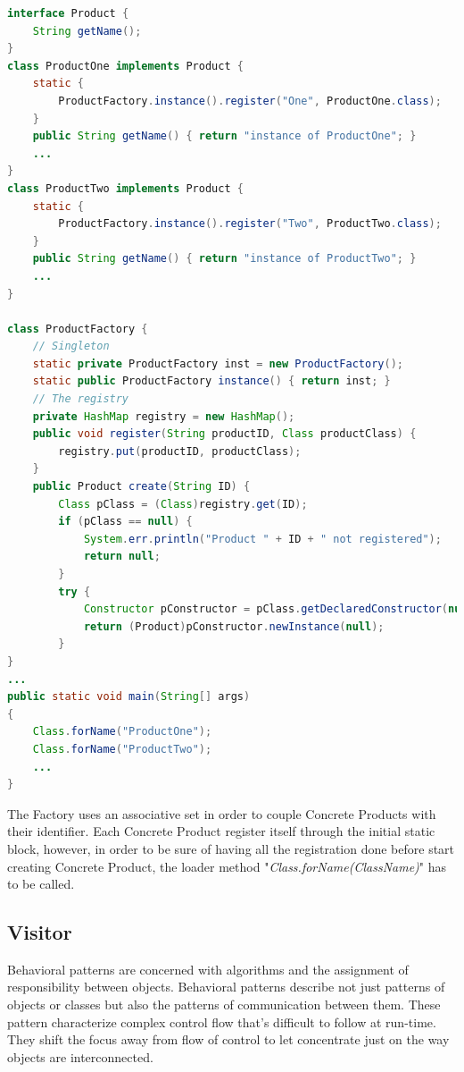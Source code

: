 \begin{lstlisting}[language=Java]
interface Product {
	String getName();
}
class ProductOne implements Product {
	static {
		ProductFactory.instance().register("One", ProductOne.class);
	}
	public String getName() { return "instance of ProductOne"; }
    ...		
}
class ProductTwo implements Product {
	static {
		ProductFactory.instance().register("Two", ProductTwo.class);
	}
	public String getName() { return "instance of ProductTwo"; }
    ...	
}

class ProductFactory {
	// Singleton
	static private ProductFactory inst = new ProductFactory();
	static public ProductFactory instance() { return inst; }
	// The registry
	private HashMap registry = new HashMap();
	public void register(String productID, Class productClass) {
		registry.put(productID, productClass);
	}
	public Product create(String ID) {
		Class pClass = (Class)registry.get(ID);
		if (pClass == null) {
			System.err.println("Product " + ID + " not registered");
			return null;
		}
		try {
			Constructor pConstructor = pClass.getDeclaredConstructor(null);
			return (Product)pConstructor.newInstance(null);
		}
}
...
public static void main(String[] args)
{
	Class.forName("ProductOne");
	Class.forName("ProductTwo");
    ...
}
\end{lstlisting}
The Factory uses an associative set in order to couple Concrete Products with their identifier. Each Concrete Product register itself through the initial static block, however, in order to be sure of having all the registration done before start creating Concrete Product, the loader method "\textit{Class.forName(ClassName)}" has to be called.

\subsection{Visitor}
\label{ssec:visitor}

Behavioral patterns are concerned with algorithms and the assignment of responsibility between objects. Behavioral patterns describe not just patterns of objects or classes but also the patterns of communication between them. These pattern characterize complex control flow that's difficult to follow at run-time. They shift the focus away from flow of control to let concentrate just on the way objects are interconnected. 
